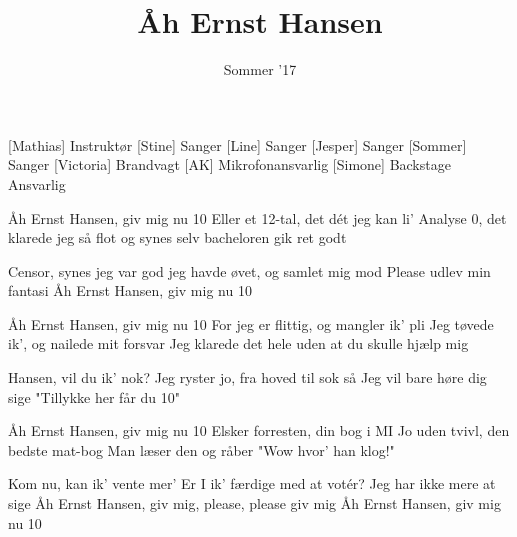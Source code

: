 \documentclass[a4paper,11pt]{article}
\title{Åh Ernst Hansen}
\author{Sommer '17}
\begin{document}
\maketitle

\begin{roles}
[Mathias] Instruktør
[Stine] Sanger
[Line] Sanger
[Jesper] Sanger
[Sommer] Sanger
[Victoria] Brandvagt
[AK] Mikrofonansvarlig
[Simone] Backstage Ansvarlig
\end{roles}

\begin{song}
 Åh Ernst Hansen, giv mig nu 10
Eller et 12-tal, det dét jeg kan li'
Analyse 0, det klarede jeg så flot
og synes selv bacheloren gik ret godt

 Censor, synes jeg var god
jeg havde øvet, og samlet mig mod
Please udlev min fantasi
Åh Ernst Hansen, giv mig nu 10
 
 Åh Ernst Hansen, giv mig nu 10
For jeg er flittig, og mangler ik' pli
Jeg tøvede ik', og nailede mit forsvar
Jeg klarede det hele uden at du skulle hjælp mig

 Hansen, vil du ik' nok?
Jeg ryster jo, fra hoved til sok
så Jeg vil bare høre dig sige
"Tillykke her får du 10"

 Åh Ernst Hansen, giv mig nu 10
Elsker forresten, din bog i MI
Jo uden tvivl, den bedste mat-bog
Man læser den og råber "Wow hvor' han klog!"

 Kom nu, kan ik' vente mer'
Er I ik' færdige med at votér?
Jeg har ikke mere at sige
Åh Ernst Hansen, giv mig, please, please giv mig
Åh Ernst Hansen, giv mig nu 10
\end{song}
\end{document}
